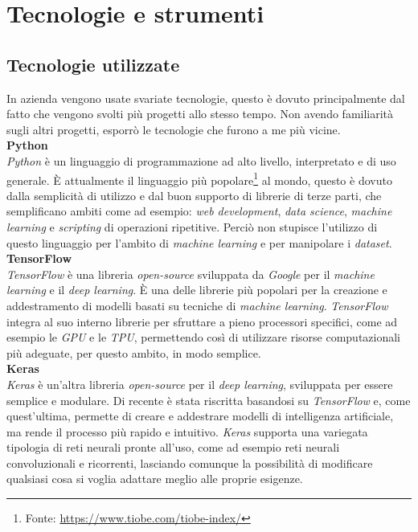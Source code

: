 \section{Tecnologie e strumenti}

\subsection{Tecnologie utilizzate}\noindent
In azienda vengono usate svariate tecnologie, questo è dovuto principalmente dal fatto che vengono svolti più progetti allo stesso tempo. Non avendo familiarità sugli altri progetti, esporrò le tecnologie che furono a me più vicine.\\
\textbf{Python}\\
\textit{Python} è un linguaggio di programmazione ad alto livello, interpretato e di uso generale.
È attualmente il linguaggio più popolare\footnote{Fonte: \href{https://www.tiobe.com/tiobe-index/}{https://www.tiobe.com/tiobe-index/}} al mondo, questo è dovuto dalla semplicità di utilizzo e dal buon supporto di librerie di terze parti, che semplificano ambiti come ad esempio: \textit{web development}, \textit{data science}, \textit{machine learning} e \textit{scripting} di operazioni ripetitive.
Perciò non stupisce l'utilizzo di questo linguaggio per l'ambito di \textit{machine learning} e per manipolare i \textit{dataset}.
\textbf{TensorFlow}\\
\textit{TensorFlow} è una libreria \textit{open-source} sviluppata da \textit{Google} per il \textit{machine learning} e il \textit{deep learning}.
È una delle librerie più popolari per la creazione e addestramento di modelli basati su tecniche di \textit{machine learning}.
\textit{TensorFlow} integra al suo interno librerie per sfruttare a pieno processori specifici, come ad esempio le \textit{GPU} e le \textit{TPU}, permettendo così di utilizzare risorse computazionali più adeguate, per questo ambito, in modo semplice.\\
\textbf{Keras}\\
\textit{Keras} è un'altra libreria \textit{open-source} per il \textit{deep learning}, sviluppata per essere semplice e modulare.
Di recente è stata riscritta basandosi su \textit{TensorFlow} e, come quest'ultima, permette di creare e addestrare modelli di intelligenza artificiale, ma rende il processo più rapido e intuitivo.
\textit{Keras} supporta una variegata tipologia di reti neurali pronte all'uso, come ad esempio reti neurali convoluzionali e ricorrenti, lasciando comunque la possibilità di modificare qualsiasi cosa si voglia adattare meglio alle proprie esigenze.


